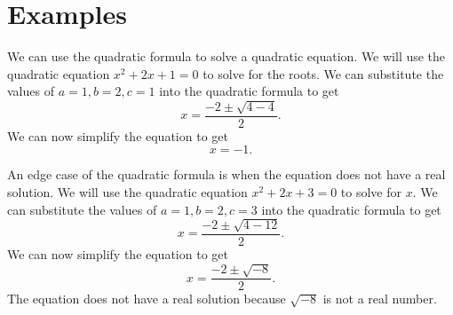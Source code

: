 \documentclass[12pt]{article}
\begin{document}
\section{Examples}
\label{sec:Examples}
We can use the quadratic formula to solve a quadratic equation. We will use the quadratic equation $x^2 + 2x + 1 = 0$ to
solve for the roots. We can substitute the values of $a = 1, b = 2, c = 1$ into the quadratic formula to get
\[x = \frac{-2 \pm \sqrt{4 - 4}}{2}.\]
We can now simplify the equation to get
\[x = -1.\]

An edge case of the quadratic formula is when the equation does not have a real solution. We will use the quadratic equation
$x^2 + 2x + 3 = 0$ to solve for $x$. We can substitute the values of $a = 1, b = 2, c = 3$ into the quadratic formula to get
\[x = \frac{-2 \pm \sqrt{4 - 12}}{2}.\]
We can now simplify the equation to get
\[x = \frac{-2 \pm \sqrt{-8}}{2}.\]
The equation does not have a real solution because $\sqrt{-8}$ is not a real number. 
\end{document}
